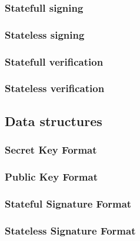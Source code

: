 \subsubsection{Statefull signing}

\subsubsection{Stateless signing}

\subsubsection{Statefull verification}

\subsubsection{Stateless verification}

\subsection{Data structures}

\subsubsection{Secret Key Format}

\subsubsection{Public Key Format}

\subsubsection{Stateful Signature Format}

\subsubsection{Stateless Signature Format}